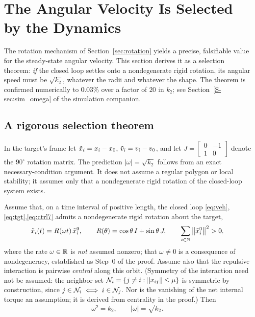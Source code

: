 \section{The Angular Velocity Is Selected by the Dynamics}
\label{sec:simulation}

The rotation mechanism of Section~\ref{sec:rotation} yields a precise, falsifiable value for the
steady-state angular velocity. This section derives it as a selection theorem: \emph{if} the closed
loop settles onto a nondegenerate rigid rotation, its angular speed must be $\sqrt{k_2}$, whatever the
radii and whatever the shape. The theorem is confirmed numerically to $0.03\%$ over a factor of $20$ in
$k_2$; see Section~\ref{S-sec:sim_omega} of the simulation companion.

\subsection{A rigorous selection theorem}
In the target's frame let $\tilde{x}_i=x_i-x_0$, $\tilde{v}_i=v_i-v_0$, and let
$J=\begin{bmatrix}0&-1\\1&0\end{bmatrix}$ denote the $90^\circ$ rotation matrix. The prediction
$|\omega|=\sqrt{k_2}$ follows from an exact necessary-condition argument. It does not assume a
regular polygon or local stability; it assumes only that a nondegenerate rigid rotation of the
closed-loop system exists.

\begin{proposition}\label{prop:omega}
Assume that, on a time interval of positive length, the closed loop
\eqref{eq:veh},\eqref{eq:tgt},\eqref{eq:ctrl7} admits a nondegenerate rigid rotation about the target,
\begin{equation}
  \tilde{x}_i(t)=R(\omega t)\,\tilde{x}_i^0,
  \qquad R(\theta)=\cos\theta\,I+\sin\theta\,J,
  \qquad \sum_{i\in\mathbb{N}}\left\| \tilde{x}_i^0 \right\|^2>0 ,
  \label{eq:rigidrot}
\end{equation}
where the rate $\omega\in\mathbb{R}$ is \emph{not} assumed nonzero; that $\omega\ne0$ is a consequence of
nondegeneracy, established as Step~0 of the proof.
Assume also that the repulsive interaction is pairwise \emph{central} along this orbit. (Symmetry of
the interaction need not be assumed: the neighbor set $\mathcal{N}_i=\{j\ne i:\left\| x_{ij} \right\|\le\mu\}$ is
symmetric by construction, since $j\in\mathcal{N}_i\iff i\in\mathcal{N}_j$. Nor is the vanishing of the net
internal torque an assumption; it is derived from centrality in the proof.) Then
\begin{equation}
  \omega^2=k_2,
  \qquad |\omega|=\sqrt{k_2}.
\end{equation}
\end{proposition}

